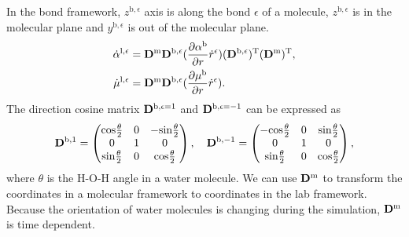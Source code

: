 In the bond framework, $z^{\text{b},\epsilon}$ axis is along the bond $\epsilon$ of a molecule, $z^{\text{b},\epsilon}$
is in the molecular plane and $y^{\text{b},\epsilon}$ is out of the molecular plane.
\begin{align}
  \dot{\alpha}^{\text{l},\epsilon} &= {\bf{D}}^{\text{m}}{\bf{D}}^{\text{b},\epsilon}(\frac{\partial{\alpha}^{\text{b}}}{\partial r}\dot
    r^{\epsilon})({\bf D}^{\text{b},\epsilon})^{\text{T}}({\bf D}^{\text{m}})^{\text{T}}, \\ 
    \dot\mu^{\text{l},\epsilon} &= {\bf{D}}^{\text{m}}{\bf{D}}^{\text{b},\epsilon}(\frac{\partial \mu^{\text{b}}}{\partial r}\dot r^{\epsilon}).
    \label{eq:dot_mu-alpha}
 \end{align}
The direction cosine matrix ${\bf{D}}^{\text{b},\epsilon=1}$ and ${\bf{D}}^{\text{b},\epsilon=-1}$ can be expressed as 
\begin{equation}
    {\bf{D}}^{\text{b},1}=\left(
                \begin{matrix}
                    \text{cos}\frac{\theta}{2} &  0  & -\text{sin}\frac{\theta}{2}\\
                    0 & 1 & 0\\
                    \text{sin}\frac{\theta}{2} & 0 & \text{cos}\frac{\theta}{2}
\end{matrix}
\right),\quad
    {\bf{D}}^{\text{b},-1}=\left(
         \begin{matrix}
             -\text{cos}\frac{\theta}{2} & 0 & \text{sin}\frac{\theta}{2}\\
             0 & 1 & 0\\
             \text{sin}\frac{\theta}{2} & 0  & \text{cos}\frac{\theta}{2}
\end{matrix}
\right),
\label{eq:D_b}
\end{equation}
where $\theta$ is the H-O-H angle in a water molecule.
We can use ${\bf{D}}^{\text{m}}$ to transform the coordinates in a molecular framework to coordinates in the lab framework. 
Because the orientation of water molecules is changing during the simulation, 
${\bf{D}}^{\text{m}}$ is time dependent. 
